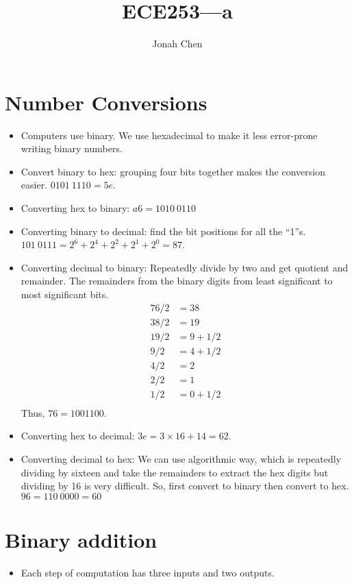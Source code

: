\documentclass[a4paper, 10pt]{article}
\title{ECE253---a}
\author{Jonah Chen}
\numberwithin{equation}{section}
\begin{document}
\maketitle
\tableofcontents

\section{Number Conversions}

\begin{itemize}
    \item Computers use binary. We use hexadecimal to make it less error-prone writing binary numbers.
    \item Convert binary to hex: grouping four bits together makes the conversion easier. $0101\:1110=5e$.
    \item Converting hex to binary: $a6=1010\:0110$
    \item Converting binary to decimal: find the bit positions for all the ``1''s. $101\:0111=2^6+2^4+2^2+2^1+2^0=87$.
    \item Converting decimal to binary: Repeatedly divide by two and get quotient and remainder. The remainders from the binary digits from least significant to most significant bits.
    \begin{align*}
        76/2&=38\\
        38/2&=19\\
        19/2&=9+1/2\\
        9/2&=4+1/2\\
        4/2&=2\\
        2/2&=1\\
        1/2&=0+1/2\\
    \end{align*}
    Thus, $76=1001100$. 
    \item Converting hex to decimal: $3e=3\times 16+14=62$.
    \item Converting decimal to hex: We can use algorithmic way, which is repeatedly dividing by sixteen and take the remainders to extract the hex digits but dividing by 16 is very difficult. So, first convert to binary then convert to hex. $96=110\:0000=60$
\end{itemize}

\section{Binary addition}
\begin{itemize}
    \item Each step of computation has three inputs and two outputs. 
\end{itemize}
\end{document}
